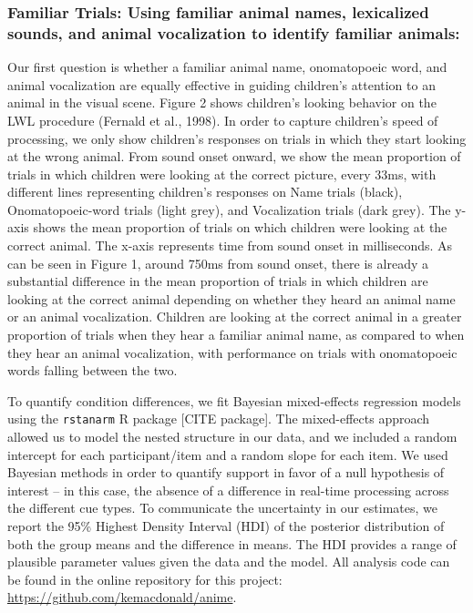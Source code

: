 \documentclass[english,floatsintext,man]{apa6}
\theoremstyle{definition}
\theoremstyle{definition}
\theoremstyle{definition}
\theoremstyle{remark}
\begin{document}
\subsubsection{Familiar Trials: Using familiar animal names, lexicalized
sounds, and animal vocalization to identify familiar
animals:}\label{familiar-trials-using-familiar-animal-names-lexicalized-sounds-and-animal-vocalization-to-identify-familiar-animals}

Our first question is whether a familiar animal name, onomatopoeic word,
and animal vocalization are equally effective in guiding children's
attention to an animal in the visual scene. Figure 2 shows children's
looking behavior on the LWL procedure (Fernald et al., 1998). In order
to capture children's speed of processing, we only show children's
responses on trials in which they start looking at the wrong animal.
From sound onset onward, we show the mean proportion of trials in which
children were looking at the correct picture, every 33ms, with different
lines representing children's responses on Name trials (black),
Onomatopoeic-word trials (light grey), and Vocalization trials (dark
grey). The y-axis shows the mean proportion of trials on which children
were looking at the correct animal. The x-axis represents time from
sound onset in milliseconds. As can be seen in Figure 1, around 750ms
from sound onset, there is already a substantial difference in the mean
proportion of trials in which children are looking at the correct animal
depending on whether they heard an animal name or an animal
vocalization. Children are looking at the correct animal in a greater
proportion of trials when they hear a familiar animal name, as compared
to when they hear an animal vocalization, with performance on trials
with onomatopoeic words falling between the two.

To quantify condition differences, we fit Bayesian mixed-effects
regression models using the \texttt{rstanarm} R package {[}CITE
package{]}. The mixed-effects approach allowed us to model the nested
structure in our data, and we included a random intercept for each
participant/item and a random slope for each item. We used Bayesian
methods in order to quantify support in favor of a null hypothesis of
interest -- in this case, the absence of a difference in real-time
processing across the different cue types. To communicate the
uncertainty in our estimates, we report the 95\% Highest Density
Interval (HDI) of the posterior distribution of both the group means and
the difference in means. The HDI provides a range of plausible parameter
values given the data and the model. All analysis code can be found in
the online repository for this project:
\url{https://github.com/kemacdonald/anime}.
\end{document}
